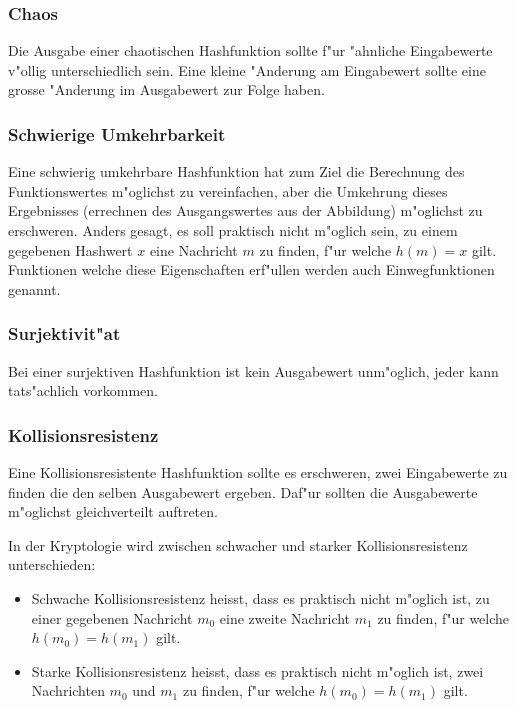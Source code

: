 \begin{refsection}
\subsubsection{Chaos}

Die Ausgabe einer chaotischen Hashfunktion sollte f"ur "ahnliche Eingabewerte
v"ollig unterschiedlich sein. Eine kleine "Anderung am Eingabewert sollte eine
grosse "Anderung im Ausgabewert zur Folge haben.

\subsubsection{Schwierige Umkehrbarkeit}

Eine schwierig umkehrbare Hashfunktion hat zum Ziel die Berechnung des
Funktionswertes m"oglichst zu vereinfachen, aber die Umkehrung dieses Ergebnisses
(errechnen des Ausgangswertes aus der Abbildung) m"oglichst zu erschweren. Anders
gesagt, es soll praktisch nicht m"oglich sein, zu einem gegebenen Hashwert $x$
eine Nachricht $m$ zu finden, f"ur welche $h(m) = x$ gilt.  Funktionen welche
diese Eigenschaften erf"ullen werden auch Einwegfunktionen genannt.

\subsubsection{Surjektivit"at}

Bei einer surjektiven Hashfunktion ist kein Ausgabewert unm"oglich, jeder kann
tats"achlich vorkommen.

\subsubsection{Kollisionsresistenz}
\label{crypto:kollisionsresistenz}

Eine Kollisionsresistente Hashfunktion sollte es erschweren, zwei Eingabewerte
zu finden die den selben Ausgabewert ergeben. Daf"ur sollten die Ausgabewerte
m"oglichst gleichverteilt auftreten.

In der Kryptologie wird zwischen schwacher und starker Kollisionsresistenz
unterschieden:

\begin{itemize}
		\item Schwache Kollisionsresistenz heisst, dass es praktisch nicht m"oglich
			ist, zu einer gegebenen Nachricht $m_0$ eine zweite Nachricht $m_1$ zu finden, f"ur
			welche $h(m_0) = h(m_1)$ gilt.
		\item Starke Kollisionsresistenz heisst, dass es praktisch nicht m"oglich
			ist, zwei Nachrichten $m_0$ und $m_1$ zu finden, f"ur welche $h(m_0) =
			h(m_1)$ gilt.
\end{itemize}


\end{refsection}
